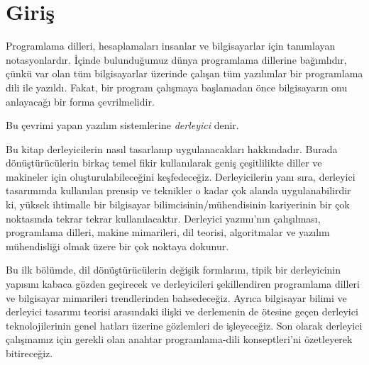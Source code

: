 \pagestyle{myheadings}
\renewcommand{\chaptername}{Bölüm}

\chapter{Giriş}
Programlama dilleri, hesaplamaları insanlar ve bilgisayarlar için tanımlayan notasyonlardır. İçinde bulunduğumuz dünya programlama dillerine bağımlıdır, çünkü var olan tüm bilgisayarlar üzerinde çalışan tüm yazılımlar bir programlama dili ile yazıldı. Fakat, bir program çalışmaya başlamadan önce bilgisayarın onu anlayacağı bir forma çevrilmelidir.

Bu çevrimi yapan yazılım sistemlerine  \textit{derleyici} denir.

Bu kitap derleyicilerin nasıl tasarlanıp uygulanacakları hakkındadır. Burada dönüştürücülerin birkaç temel fikir kullanılarak geniş çeşitlilikte diller ve makineler için oluşturulabileceğini keşfedeceğiz. Derleyicilerin yanı sıra, derleyici tasarımında kullanılan prensip ve teknikler o kadar çok alanda uygulanabilirdir ki, yüksek ihtimalle bir bilgisayar bilimcisinin/mühendisinin kariyerinin bir çok noktasında tekrar tekrar kullanılacaktır. Derleyici yazımı'nın çalışılması, programlama dilleri, makine mimarileri, dil teorisi, algoritmalar ve yazılım mühendisliği olmak üzere bir çok noktaya dokunur.

Bu ilk bölümde, dil dönüştürücülerin değişik formlarını, tipik bir derleyicinin yapısını kabaca gözden geçirecek ve derleyicileri şekillendiren programlama dilleri ve bilgisayar mimarileri trendlerinden bahsedeceğiz. Ayrıca bilgisayar bilimi ve derleyici tasarımı teorisi arasındaki ilişki ve derlemenin de ötesine geçen derleyici teknolojilerinin genel hatları üzerine gözlemleri de işleyeceğiz. Son olarak derleyici çalışmamız için gerekli olan anahtar programlama-dili konseptleri'ni özetleyerek bitireceğiz.



